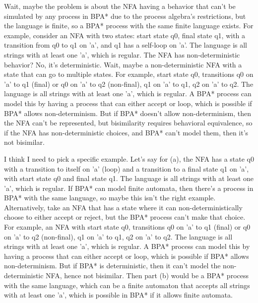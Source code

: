 Wait, maybe the problem is about the NFA having a behavior that can't be simulated by any process in BPA* due to the process algebra's restrictions, but the language is finite, so a BPA* process with the same finite language exists. For example, consider an NFA with two states: start state q0, final state q1, with a transition from q0 to q1 on 'a', and q1 has a self-loop on 'a'. The language is all strings with at least one 'a', which is regular. The NFA has non-deterministic behavior? No, it's deterministic. Wait, maybe a non-deterministic NFA with a state that can go to multiple states. For example, start state q0, transitions q0 on 'a' to q1 (final) or q0 on 'a' to q2 (non-final), q1 on 'a' to q1, q2 on 'a' to q2. The language is all strings with at least one 'a', which is regular. A BPA* process can model this by having a process that can either accept or loop, which is possible if BPA* allows non-determinism. But if BPA* doesn't allow non-determinism, then the NFA can't be represented, but bisimilarity requires behavioral equivalence, so if the NFA has non-deterministic choices, and BPA* can't model them, then it's not bisimilar.

I think I need to pick a specific example. Let's say for (a), the NFA has a state q0 with a transition to itself on 'a' (loop) and a transition to a final state q1 on 'a', with start state q0 and final state q1. The language is all strings with at least one 'a', which is regular. If BPA* can model finite automata, then there's a process in BPA* with the same language, so maybe this isn't the right example. Alternatively, take an NFA that has a state where it can non-deterministically choose to either accept or reject, but the BPA* process can't make that choice. For example, an NFA with start state q0, transitions q0 on 'a' to q1 (final) or q0 on 'a' to q2 (non-final), q1 on 'a' to q1, q2 on 'a' to q2. The language is all strings with at least one 'a', which is regular. A BPA* process can model this by having a process that can either accept or loop, which is possible if BPA* allows non-determinism. But if BPA* is deterministic, then it can't model the non-deterministic NFA, hence not bisimilar. Then part (b) would be a BPA* process with the same language, which can be a finite automaton that accepts all strings with at least one 'a', which is possible in BPA* if it allows finite automata.

